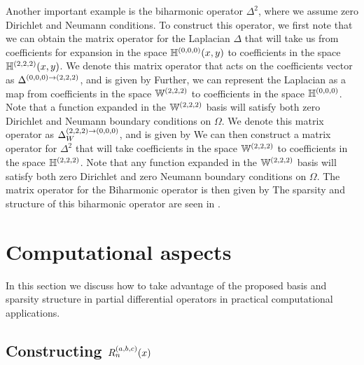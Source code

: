 Another important example is the biharmonic operator  $\Delta^2$, where we assume zero Dirichlet and Neumann conditions. To construct this operator, we first note that we can obtain the matrix operator for the Laplacian $\Delta$ that will take us from coefficients for expansion in the space ${\mathbb{H}^{(0,0,0)}}(x,y)$ to coefficients in the space $\mathbb{H}^{(2,2,2)}(x,y)$. We denote this matrix operator that acts on the coefficients vector as $\Delta^{(0,0,0)\to(2,2,2)}$, and is given by
Further, we can represent the Laplacian as a map from coefficients in the space $\mathbb{W}^{(2,2,2)}$ to coefficients in the space ${\mathbb{H}^{(0,0,0)}}$. Note that a function expanded in the $\mathbb{W}^{(2,2,2)}$ basis will satisfy both zero Dirichlet and Neumann boundary conditions on $\Omega$. We denote this matrix operator as $\Delta_W^{(2,2,2)\to(0,0,0)}$, and is given by
We can then construct a matrix operator for $\Delta^2$ that will take coefficients in the space $\mathbb{W}^{(2,2,2)}$ to coefficients in the space $\mathbb{H}^{(2,2,2)}$. Note that any function expanded in the $\mathbb{W}^{(2,2,2)}$ basis will satisfy both zero Dirichlet and zero Neumann boundary conditions on $\Omega$. The matrix operator for the Biharmonic operator is then given by
The sparsity and structure of this biharmonic operator are seen in .



\section{Computational aspects}\label{Section:Computation}

In this section we discuss how to take advantage of the proposed basis and sparsity structure in partial differential operators in practical computational applications.

\subsection{Constructing $R_n^{(a,b,c)}(x)$}



